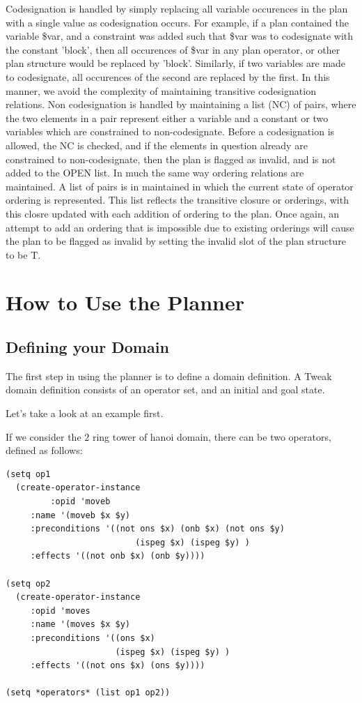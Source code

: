 Codesignation is handled by simply replacing all variable
occurences in the plan with a single value as codesignation occurs.  For
example, if a plan contained the variable \$var, and a constraint was added such
that \$var was to codesignate with the constant 'block', then all occurences of
\$var in any plan operator, or other plan structure would be replaced by
'block'.
Similarly, if two variables are made to codesignate, all occurences of the
second are replaced by the first.  In this manner, we avoid the complexity of
maintaining transitive codesignation relations.  Non codesignation is handled
by maintaining a list (NC) of pairs, where the two elements in a pair represent
either a variable and a constant or two variables which are constrained to
non-codesignate. Before a codesignation is allowed, the NC is checked, and if
the elements in question already are constrained to non-codesignate, then the
plan is flagged as invalid, and is not added to the OPEN list.  In much the
same way ordering relations are maintained.  A list of pairs is in maintained in
which the current state of operator ordering is represented.  This list
reflects the transitive closure or orderings, with this closre updated with
each addition of ordering to the plan.  Once again, an attempt to add an
ordering that is impossible due to existing orderings will cause the plan to be flagged as invalid by setting the invalid slot of the plan structure to be T.

\section{How to Use the Planner}

\subsection{Defining your Domain}

The first step in using the planner is to define a domain definition.
A Tweak domain definition consists of an operator set, and an initial and goal state.

Let's take a look at an example first.

If we consider the 2 ring tower of hanoi domain, there can be  two operators, defined as follows:

\begin{verbatim}
(setq op1 
  (create-operator-instance
         :opid 'moveb
	 :name '(moveb $x $y)
	 :preconditions '((not ons $x) (onb $x) (not ons $y)
                          (ispeg $x) (ispeg $y) )
	 :effects '((not onb $x) (onb $y))))

(setq op2 
  (create-operator-instance
	 :opid 'moves
	 :name '(moves $x $y)
	 :preconditions '((ons $x)
	                  (ispeg $x) (ispeg $y) )
	 :effects '((not ons $x) (ons $y))))

(setq *operators* (list op1 op2))
\end{verbatim}


